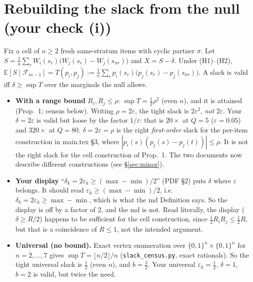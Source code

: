 \documentclass[11pt]{article}
\begin{document}
\section{Rebuilding the slack from the null (your check (i))}
Fix a cell of $n\ge2$ fresh same-stratum items with cyclic partner $\sigma$. Let $S=\frac1n\sum_r W_i(s_r)\big(W_j(s_r)-W_j(s_{\sigma r})\big)$ and $X=S-\delta$. Under (H1)--(H2), $\mathbb E[S\mid\mathcal F_{m-1}]=T(p_i,p_j):=\frac1n\sum_r p_i(s_r)\big(p_j(s_r)-p_j(s_{\sigma r})\big)$. A slack is valid iff $\delta\ge\sup T$ over the marginals the null allows.
\begin{itemize}[nosep]
\item \textbf{With a range bound} $R_i,R_j\le\rho$: $\sup T=\frac12\rho^2$ (even $n$), and it is attained (Prop.~1; census below). Writing $\rho=2\varepsilon$, the tight slack is $2\varepsilon^2$, \emph{not} $2\varepsilon$. Your $\delta=2\varepsilon$ is valid but loose by the factor $1/\varepsilon$: that is $20\times$ at $Q=5$ ($\varepsilon=0.05$) and $320\times$ at $Q=80$. $\delta=2\varepsilon=\rho$ is the right \emph{first-order} slack for the per-item construction in main.tex \S3, where $|p_i(s)(p_j(s)-p_j(t))|\le\rho$. It is not the right slack for the cell construction of Prop.~1. The two documents now describe different constructions (see \S\ref{sec:minor}).
\item \textbf{Your display} ``$\delta_k=2\varepsilon_k\ge(\max-\min)/2$'' (PDF \S2) puts $\delta$ where $\varepsilon$ belongs. It should read $\varepsilon_k\ge(\max-\min)/2$, i.e.\ $\delta_k=2\varepsilon_k\ge\max-\min$, which is what the md Definition says. So the display is off by a factor of $2$, and the md is not. Read literally, the display ($\delta\ge R/2$) happens to be sufficient for the cell construction, since $\frac12R_iR_j\le\frac12R$, but that is a coincidence of $R\le1$, not the intended argument.
\item \textbf{Universal (no bound).} Exact vertex enumeration over $\{0,1\}^n\times\{0,1\}^n$ for $n=2,\dots,7$ gives $\sup T=\lfloor n/2\rfloor/n$ (\texttt{slack\_census.py}, exact rationals). So the tight universal slack is $\frac12$ (even $n$), and $b=\frac32$. Your universal $\varepsilon_k=\frac12$, $\delta=1$, $b=2$ is valid, but twice the need.
\end{itemize}
\end{document}
